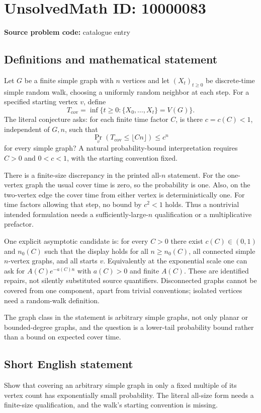 \documentclass[11pt]{article}
\begin{document}
\section*{UnsolvedMath ID: 10000083}
\textbf{Source problem code:} catalogue entry
\subsection{Definitions and mathematical statement}
Let $G$ be a finite simple graph with $n$ vertices and let $(X_t)_{t\geq0}$ be discrete-time simple random walk, choosing a uniformly random neighbor at each step. For a specified starting vertex $v$, define
\[
T_{\mathrm{cov}}=\inf\{t\geq0:\{X_0,\ldots,X_t\}=V(G)\}.
\]
The literal conjecture asks: for each finite time factor $C$, is there $c=c(C)<1$, independent of $G,n$, such that
\[
\Pr_v(T_{\mathrm{cov}}\leq\lfloor Cn\rfloor)\leq c^n
\]
for every simple graph? A natural probability-bound interpretation requires $C>0$ and $0<c<1$, with the starting convention fixed.

There is a finite-size discrepancy in the printed all-$n$ statement. For the one-vertex graph the usual cover time is zero, so the probability is one. Also, on the two-vertex edge the cover time from either vertex is deterministically one. For time factors allowing that step, no bound by $c^2<1$ holds. Thus a nontrivial intended formulation needs a sufficiently-large-$n$ qualification or a multiplicative prefactor.

One explicit asymptotic candidate is: for every $C>0$ there exist $c(C)\in(0,1)$ and $n_0(C)$ such that the display holds for all $n\geq n_0(C)$, all connected simple $n$-vertex graphs, and all starts $v$. Equivalently at the exponential scale one can ask for $A(C)e^{-a(C)n}$ with $a(C)>0$ and finite $A(C)$. These are identified repairs, not silently substituted source quantifiers. Disconnected graphs cannot be covered from one component, apart from trivial conventions; isolated vertices need a random-walk definition.

The graph class in the statement is arbitrary simple graphs, not only planar or bounded-degree graphs, and the question is a lower-tail probability bound rather than a bound on expected cover time.
\subsection{Short English statement}
Show that covering an arbitrary simple graph in only a fixed multiple of its vertex count has exponentially small probability. The literal all-size form needs a finite-size qualification, and the walk's starting convention is missing.
\end{document}
